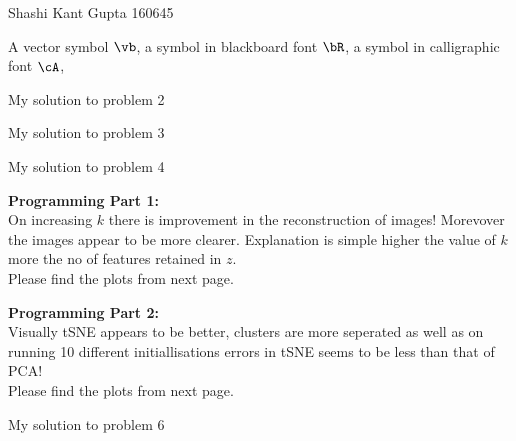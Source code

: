 \documentclass[a4paper,11pt]{article}
\begin{document}
{Shashi Kant Gupta}   %
{160645}	%

\begin{mlsolution}

A vector symbol $\vb$, a symbol in blackboard font $\bR$, a symbol in calligraphic font $\cA$,   


\end{mlsolution}

\begin{mlsolution}

My solution to problem 2


\end{mlsolution}

\begin{mlsolution}

My solution to problem 3

\end{mlsolution}

\begin{mlsolution}

My solution to problem 4

\end{mlsolution}

\begin{mlsolution}
\noindent
\textbf{Programming Part 1: }\\
On increasing $k$ there is improvement in the reconstruction of images! Morevover the images appear to be more clearer.
Explanation is simple higher the value of $k$ more the no of features retained in $z$.\\
Please find the plots from next page.

\newpage
\noindent
\textbf{Programming Part 2: }\\
Visually tSNE appears to be better, clusters are more seperated as well as on running 10 different initiallisations errors in tSNE seems to be less than that of PCA! \\
Please find the plots from next page.

\end{mlsolution}

\begin{mlsolution}

My solution to problem 6

\end{mlsolution}
\end{document}
